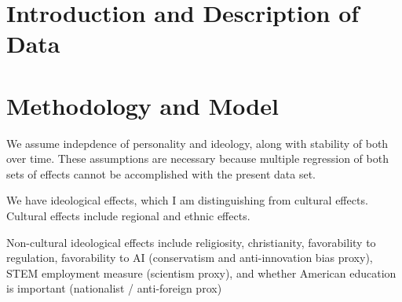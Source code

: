\documentclass[review]{elsarticle}
\begin{document}
\pagebreak
\linenumbers

\section{Introduction and Description of Data}




\section{Methodology and Model}

We assume indepdence of personality and ideology, along with stability of both over time.
These assumptions are necessary because multiple regression of both sets of effects cannot be accomplished with the present data set.

We have ideological effects, which I am distinguishing from cultural effects.
Cultural effects include regional and ethnic effects.

Non-cultural ideological effects include religiosity,
christianity,
favorability to regulation,
favorability to AI (conservatism and anti-innovation bias proxy),
STEM employment measure (scientism proxy),
and whether American education is important (nationalist / anti-foreign prox)
\end{document}
